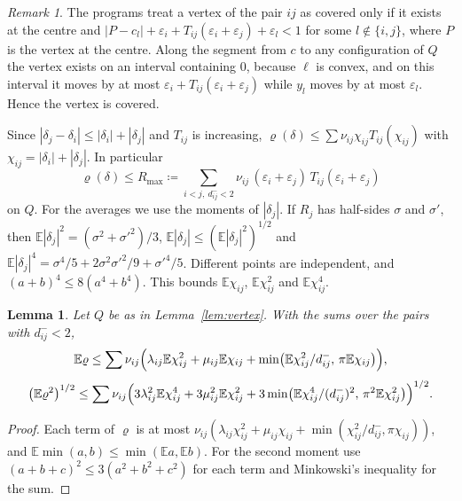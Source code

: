 \documentclass[11pt]{amsart}
\newtheorem{lemma}[theorem]{Lemma}
\theoremstyle{definition}
\theoremstyle{remark}
\newtheorem{remark}[theorem]{Remark}
\numberwithin{equation}{section}
\newcommand{\E}{\mathbb{E}}
\begin{document}
\begin{remark}\label{rem:prune}
The programs treat a vertex of the pair $ij$ as covered only if it exists at the centre and $|P-c_l|+\varepsilon_i+T_{ij}(\varepsilon_i+\varepsilon_j)+\varepsilon_l<1$ for some $l\notin\{i,j\}$, where $P$ is the vertex at the centre. Along the segment from $c$ to any configuration of $Q$ the vertex exists on an interval containing $0$, because $\ell$ is convex, and on this interval it moves by at most $\varepsilon_i+T_{ij}(\varepsilon_i+\varepsilon_j)$ while $y_l$ moves by at most $\varepsilon_l$. Hence the vertex is covered.
\end{remark}

Since $|\delta_j-\delta_i|\le|\delta_i|+|\delta_j|$ and $T_{ij}$ is increasing, $\varrho(\delta)\le\sum\nu_{ij}\chi_{ij}T_{ij}(\chi_{ij})$ with $\chi_{ij}=|\delta_i|+|\delta_j|$. In particular
\begin{equation}\label{eq:Rmax}
\varrho(\delta)\le R_{\max}\coloneqq\sum_{i<j,\ d^-_{ij}<2}\nu_{ij}\,(\varepsilon_i+\varepsilon_j)\,T_{ij}(\varepsilon_i+\varepsilon_j)
\end{equation}
on $Q$. For the averages we use the moments of $|\delta_j|$. If $R_j$ has half-sides $\sigma$ and $\sigma'$, then $\E|\delta_j|^2=(\sigma^2+\sigma'^2)/3$, $\E|\delta_j|\le(\E|\delta_j|^2)^{1/2}$ and $\E|\delta_j|^4=\sigma^4/5+2\sigma^2\sigma'^2/9+\sigma'^4/5$. Different points are independent, and $(a+b)^4\le8(a^4+b^4)$. This bounds $\E \chi_{ij}$, $\E \chi_{ij}^2$ and $\E \chi_{ij}^4$.

\begin{lemma}\label{lem:moments}
Let $Q$ be as in Lemma~\textup{\ref{lem:vertex}}. With the sums over the pairs with $d^-_{ij}<2$,
\[
\E\varrho\le\sum\nu_{ij}\Bigl(\lambda_{ij}\E \chi_{ij}^2+\mu_{ij}\E \chi_{ij}+\min\bigl(\E \chi_{ij}^2/d^-_{ij},\,\pi\E \chi_{ij}\bigr)\Bigr),
\]
\[
\bigl(\E\varrho^2\bigr)^{1/2}\le\sum\nu_{ij}\Bigl(3\lambda_{ij}^2\E \chi_{ij}^4+3\mu_{ij}^2\E \chi_{ij}^2+3\min\bigl(\E \chi_{ij}^4/(d^-_{ij})^2,\,\pi^2\E \chi_{ij}^2\bigr)\Bigr)^{1/2}.
\]
\end{lemma}

\begin{proof}
Each term of $\varrho$ is at most $\nu_{ij}(\lambda_{ij}\chi_{ij}^2+\mu_{ij}\chi_{ij}+\min(\chi_{ij}^2/d^-_{ij},\pi \chi_{ij}))$, and $\E\min(a,b)\le\min(\E a,\E b)$. For the second moment use $(a+b+c)^2\le3(a^2+b^2+c^2)$ for each term and Minkowski's inequality for the sum.
\end{proof}
\end{document}
